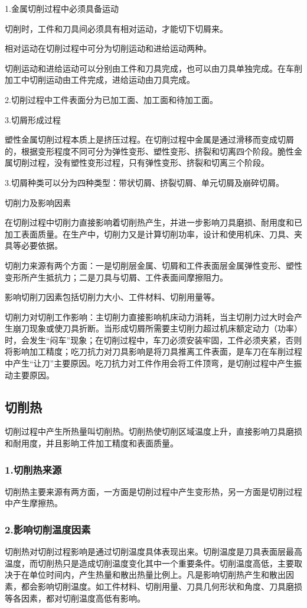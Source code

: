 \documentclass{ctexbook}
\begin{document}
1.金属切削过程中必须具备运动

切削时，工件和刀具间必须具有相对运动，才能切下切屑来。

相对运动在切削过程中可分为切削运动和进给运动两种。

切削运动和进给运动可以分别由工件和刀具完成，也可以由刀具单独完成。在车削加工中切削运动由工件完成，进给运动由刀具完成。

2.切削过程中工件表面分为已加工面、加工面和待加工面。

3.切屑形成过程

塑性金属切削过程本质上是挤压过程。在切削过程中金属是通过滑移而变成切屑的，根据变形程度不同可分为弹性变形、塑性变形、挤裂和切离四个阶段。脆性金属切削过程，没有塑性变形过程，只有弹性变形、挤裂和切离三个阶段。

3.切屑种类可以分为四种类型：带状切屑、挤裂切屑、单元切屑及崩碎切屑。

切削力及影响因素

在切削过程中切削力直接影响着切削热产生，并进一步影响刀具磨损、耐用度和已加工表面质量。在生产中，切削力又是计算切削功率，设计和使用机床、刀具、夹具等必要依据。

切削力来源有两个方面：一是切削层金属、切屑和工件表面层金属弹性变形、塑性变形所产生抵抗力；二是刀具与切屑、工件表面间摩擦阻力。

影响切削刀因素包括切削力大小、工件材料、切削用量等。

切削力对切削工作影响：主切削力直接影响机床动力消耗，当主切削力过大时会产生崩刀现象或使刀具折断。当形成切屑所需要主切削力超过机床额定动力（功率）时，会发生“闷车”现象；在切削过程中，车刀必须安装牢固，工件必须夹紧，否则将影响加工精度；吃刀抗力对刀具影响是将刀具推离工件表面，是车刀在车削过程中产生“让刀”主要原因。吃刀抗力对工件作用会将工件顶弯，是切削过程中产生振动主要原因。
\subsection{切削热}
切削过程中产生所热量叫切削热。切削热使切削区域温度上升，直接影响刀具磨损和耐用度，并且影晌工件加工精度和表面质量。
\subsubsection{1.切削热来源}
切削热主要来源有两方面，一方面是切削过程中产生变形热，另一方面是切削过程中产生摩擦热。
\subsubsection{2.影响切削温度因素}
切削热对切削过程影响是通过切削温度具体表现出来。切削温度是刀具表面层最高温度，而切削热只是造成切削温度变化其中一个重要条件。切削温度高低，主要取决于在单位时间内，产生热量和散出热量比例上。凡是影响切削热产生和散出因素，都会影响切削温度。如工件材料、切削用量、刀具几何形状和角度、刀具磨损等各因素，都对切削温度高低有影响。
\end{document}
